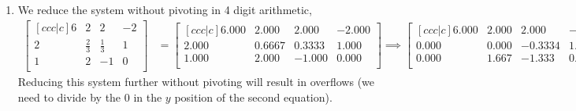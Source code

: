 \documentclass[10pt]{article}
\begin{document}
\begin{enumerate}
\begin{enumerate}
        \item We reduce the system without pivoting in 4 digit arithmetic, \begin{align*}
            \begin{bmatrix}[ccc|c]
                6 & 2 & 2 & -2 \\
                2 & \frac{2}{3} & \frac{1}{3} & 1 \\
                1 & 2 & -1 & 0 \\
            \end{bmatrix} &= 
            \begin{bmatrix}[ccc|c]
                6.000 & 2.000 & 2.000 & -2.000 \\
                2.000 & 0.6667 & 0.3333 & 1.000 \\
                1.000 & 2.000 & -1.000 & 0.000 \\
            \end{bmatrix} \implies
            \begin{bmatrix}[ccc|c]
                6.000 & 2.000 & 2.000 & -2.000 \\
                0.000 & 0.000 & -0.3334 & 1.667 \\
                0.000 & 1.667 & -1.333 & 0.3333 \\
            \end{bmatrix}.
        \end{align*} Reducing this system further without pivoting will result in overflows (we need to divide by the 0 in the \(y\) position of the second equation).


\end{enumerate}
\end{enumerate}
\end{document}
